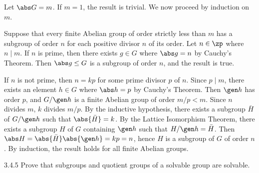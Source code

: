 \begin{sol}
    Let $\abs G = m$.
	If $m = 1$, the result is trivial.
	We now proceed by induction on $m$.

    Suppose that every finite Abelian group of order strictly less than $m$ has a subgroup of order $n$ for each positive divisor $n$ of its order.
	Let $n \in \zp$ where $n \mid m$.
	If $n$ is prime, then there exists $g \in G$ where $\abs g = n$ by Cauchy's Theorem.
	Then $\abs g \leq G$ is a subgroup of order $n$, and the result is true. 
    
    If $n$ is not prime, then $n = kp$ for some prime divisor $p$ of $n$.
	Since $p \mid m$, there exists an element $h \in G$ where $\abs h = p$ by Cauchy's Theorem.
	Then $\gen h$ has order $p$, and $G/\gen h$ is a finite Abelian group of order $m/p < m$.
	Since $n$ divides $m$, $k$ divides $m/p$.
	By the inductive hypothesis, there exists a subgroup $\bar H$ of $G/\gen h$ such that $\abs{\bar H} = k$.
	By the Lattice Isomorphism Theorem, there exists a subgroup $H$ of $G$ containing $\gen h$ such that $H/\gen h = \bar H$.
	Then $\abs H = \abs{\bar H} \abs{\gen h} = kp = n$, hence $H$ is a subgroup of $G$ of order $n$.
	By induction, the result holds for all finite Abelian groups.
\end{sol}

\begin{spex}{3.4.5}
    Prove that subgroups and quotient groups of a solvable group are solvable.
\end{spex}

